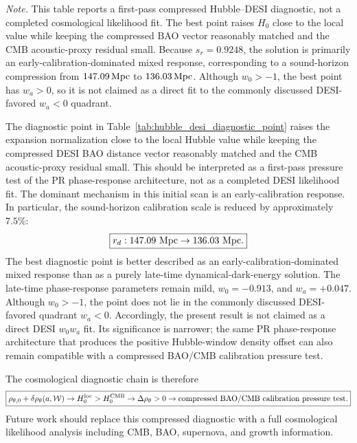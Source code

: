 \documentclass[11pt]{article}
\begin{document}
\begin{table}[H]
\begin{tabular}{p{10.0cm} c p{4.8cm}}
\end{tabular}

\vspace{0.45em}
\begin{minipage}{0.92\textwidth}
\footnotesize
\textit{Note.}
This table reports a first-pass compressed Hubble--DESI diagnostic, not a completed cosmological likelihood fit. 
The best point raises \(H_0\) close to the local value while keeping the compressed BAO vector reasonably matched and the CMB acoustic-proxy residual small. 
Because \(s_r=0.9248\), the solution is primarily an early-calibration-dominated mixed response, corresponding to a sound-horizon compression from \(147.09\,{\rm Mpc}\) to \(136.03\,{\rm Mpc}\). 
Although \(w_0>-1\), the best point has \(w_a>0\), so it is not claimed as a direct fit to the commonly discussed DESI-favored \(w_a<0\) quadrant.
\end{minipage}
\end{table}

The diagnostic point in Table~\ref{tab:hubble_desi_diagnostic_point} raises the expansion normalization close to the local Hubble value while keeping the compressed DESI BAO distance vector reasonably matched and the CMB acoustic-proxy residual small. This should be interpreted as a first-pass pressure test of the PR phase-response architecture, not as a completed DESI likelihood fit. The dominant mechanism in this initial scan is an early-calibration response. In particular, the sound-horizon calibration scale is reduced by approximately \(7.5\%\):
\begin{equation}
\boxed{
r_d:
147.09\ {\rm Mpc}
\rightarrow
136.03\ {\rm Mpc}.
}
\end{equation}
The best diagnostic point is better described as an early-calibration-dominated mixed response than as a purely late-time dynamical-dark-energy solution. The late-time phase-response parameters remain mild, $w_0=-0.913$, and $w_a=+0.047$. Although \(w_0>-1\), the point does not lie in the commonly discussed DESI-favored quadrant \(w_a<0\). Accordingly, the present result is not claimed as a direct DESI \(w_0w_a\) fit. Its significance is narrower; the same PR phase-response architecture that produces the positive Hubble-window density offset can also remain compatible with a compressed BAO/CMB calibration pressure test.

The cosmological diagnostic chain is therefore
\begin{equation}
\boxed{
\rho_{\theta,0}
+
\delta\rho_\theta(a,\mathcal W)
\rightarrow
H_0^{\rm loc}>H_0^{\rm CMB}
\rightarrow
\Delta\rho_\theta>0
\rightarrow
\text{compressed BAO/CMB calibration pressure test}.
}
\end{equation}
Future work should replace this compressed diagnostic with a full cosmological likelihood analysis including CMB, BAO, supernova, and growth information.
\end{document}
